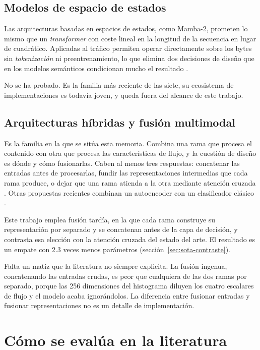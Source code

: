 \subsection{Modelos de espacio de estados}

Las arquitecturas basadas en espacios de estados, como Mamba-2, prometen lo
mismo que un \emph{transformer} con coste lineal en la longitud de la secuencia
en lugar de cuadrático. Aplicadas al tráfico permiten operar directamente sobre
los bytes sin \emph{tokenización} ni preentrenamiento, lo que elimina dos
decisiones de diseño que en los modelos semánticos condicionan mucho el resultado
\cite{MambaNetBurst2026}.

No se ha probado. Es la familia más reciente de las siete, su ecosistema de
implementaciones es todavía joven, y queda fuera del alcance de este trabajo.

\subsection{Arquitecturas híbridas y fusión multimodal}

Es la familia en la que se sitúa esta memoria. Combina una rama que procesa el
contenido con otra que procesa las características de flujo, y la cuestión de
diseño es dónde y cómo fusionarlas. Caben al menos tres respuestas: concatenar
las entradas antes de procesarlas, fundir las representaciones intermedias que
cada rama produce, o dejar que una rama atienda a la otra mediante atención
cruzada \cite{TwoBranch2026}. Otras propuestas recientes combinan un autoencoder
con un clasificador clásico \cite{HybridAutoencoder2024}.

Este trabajo emplea fusión tardía, en la que cada rama construye su
representación por separado y se concatenan antes de la capa de decisión, y
contrasta esa elección con la atención cruzada del estado del arte. El resultado
es un empate con 2.3 veces menos parámetros
(sección~\ref{sec:sota-contraste}).

Falta un matiz que la literatura no siempre explicita. La fusión
ingenua, concatenando las entradas crudas, es peor que cualquiera de las dos
ramas por separado, porque las 256 dimensiones del histograma diluyen los cuatro
escalares de flujo y el modelo acaba ignorándolos. La diferencia entre fusionar
entradas y fusionar representaciones no es un detalle de implementación.

\section{Cómo se evalúa en la literatura}
\label{sec:sota-evaluacion}

